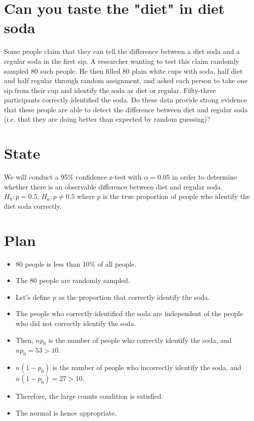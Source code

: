 \documentclass{scrreprt} %
\begin{document}
\section{Can you taste the "diet" in diet soda}

Some people claim that they can tell the difference between a diet soda and a regular soda in the
first sip. A researcher wanting to test this claim randomly sampled 80 such people. He then filled
80 plain white cups with soda, half diet and half regular through random assignment, and asked
each person to take one sip from their cup and identify the soda as diet or regular. Fifty-three
participants correctly identified the soda. Do these data provide strong evidence that these people
are able to detect the difference between diet and regular soda (i.e. that they are doing better
than expected by random guessing)?



\section{State}

We will conduct a 95\% confidence z-test with $\alpha = 0.05$ in order to determine whether there
is an observable difference between diet and regular soda. $H_0: p = 0.5$, $H_a: p \neq 0.5$
where $p$ is the true proportion of people who identify the diet soda correctly.

\section{Plan}

\begin{itemize}
	\item 80 people is less than 10\% of all people.
	\item The 80 people are randomly sampled.
	\item Let's define $p$ as the proportion that correctly identify the soda.
	\item The people who correctly identified the soda are independent of
	the people who did not correctly identify the soda.
	\item Then, $np_0$ is the number of people who correctly identify
	the soda, and $np_0 = 53 > 10$.
	\item $n(1-p_0)$ is the number of people who incorrectly identify the
	soda, and $n(1-p_0)= 27 > 10$.
	\item Therefore, the large counts condition is satisfied.
	\item The normal is hence appropriate.
\end{itemize}
\end{document}
